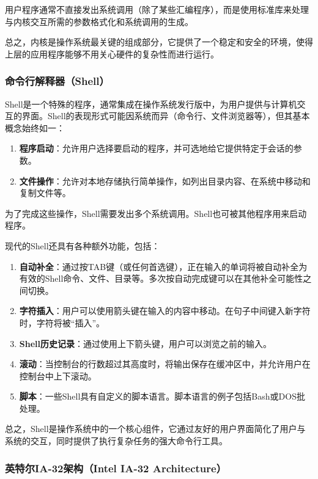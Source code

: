 用户程序通常不直接发出系统调用（除了某些汇编程序），而是使用标准库来处理与内核交互所需的参数格式化和系统调用的生成。

总之，内核是操作系统最关键的组成部分，它提供了一个稳定和安全的环境，使得上层的应用程序能够不用关心硬件的复杂性而进行运行。

\subsubsection{命令行解释器（Shell）}

Shell是一个特殊的程序，通常集成在操作系统发行版中，为用户提供与计算机交互的界面。Shell的表现形式可能因系统而异（命令行、文件浏览器等），但其基本概念始终如一：

\begin{enumerate}
    \item \textbf{程序启动}：允许用户选择要启动的程序，并可选地给它提供特定于会话的参数。
    \item \textbf{文件操作}：允许对本地存储执行简单操作，如列出目录内容、在系统中移动和复制文件等。
\end{enumerate}

为了完成这些操作，Shell需要发出多个系统调用。Shell也可被其他程序用来启动程序。

现代的Shell还具有各种额外功能，包括：

\begin{enumerate}
    \item \textbf{自动补全}：通过按TAB键（或任何首选键），正在输入的单词将被自动补全为有效的Shell命令、文件、目录等。多次按自动完成键可以在其他补全可能性之间切换。
    \item \textbf{字符插入}：用户可以使用箭头键在输入的内容中移动。在句子中间键入新字符时，字符将被“插入”。
    \item \textbf{Shell历史记录}：通过使用上下箭头键，用户可以浏览之前的输入。
    \item \textbf{滚动}：当控制台的行数超过其高度时，将输出保存在缓冲区中，并允许用户在控制台中上下滚动。
    \item \textbf{脚本}：一些Shell具有自定义的脚本语言。脚本语言的例子包括Bash或DOS批处理。
\end{enumerate}

总之，Shell是操作系统中的一个核心组件，它通过友好的用户界面简化了用户与系统的交互，同时提供了执行复杂任务的强大命令行工具。

\subsubsection{英特尔IA-32架构（Intel IA-32 Architecture）}

